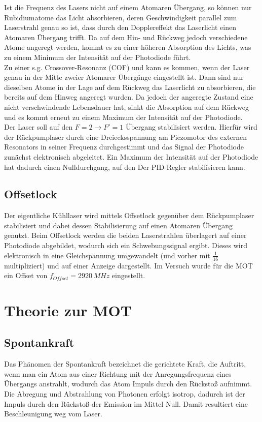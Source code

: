 \documentclass[twoside,colorback,accentcolor=tud4c,11pt]{tudreport}
\begin{document}
Ist die Frequenz des Lasers nicht auf einem Atomaren Übergang, so können nur Rubidiumatome das Licht absorbieren, deren Geschwindigkeit parallel zum Laserstrahl genau so ist, dass durch den Dopplereffekt das Laserlicht einen Atomaren Übergang trifft. Da auf dem Hin- und Rückweg jedoch verschiedene Atome angeregt werden, kommt es zu einer höheren Absorption des Lichts, was zu einem Minimum der Intensität auf der Photodiode führt.\\
Zu einer s.g. Crossover-Resonanz (COF) und kann es kommen, wenn der Laser genau in der Mitte zweier Atomarer Übergänge eingestellt ist. Dann sind nur dieselben Atome in der Lage auf dem Rückweg das Laserlicht zu absorbieren, die bereits auf dem Hinweg angeregt wurden. Da jedoch der angeregte Zustand eine nicht verschwindende Lebensdauer hat, sinkt die Absorption auf dem Rückweg und es kommt erneut zu einem Maximum der Intensität auf der Photodiode.\\
Der Laser soll auf den $F=2\rightarrow F'=1$ Übergang stabilisiert werden. Hierfür wird der Rückpumplaser durch eine Dreiecksspannung am Piezomotor des externen Resonators in seiner Frequenz durchgestimmt und das Signal der Photodiode zunächst elektronisch abgeleitet. Ein Maximum der Intensität auf der Photodiode hat dadurch einen Nulldurchgang, auf den Der PID-Regler stabilisieren kann. 
\subsection{Offsetlock}
Der eigentliche Kühllaser wird mittels Offsetlock gegenüber dem Rückpumplaser stabilisiert und dabei dessen Stabilisierung auf einen Atomaren Übergang genutzt. Beim Offsetlock werden die beiden Laserstrahlen überlagert auf einer Photodiode abgebildet, wodurch sich ein Schwebungssignal ergibt. Dieses wird elektronisch in eine Gleichspannung umgewandelt (und vorher mit $\frac{1}{16}$ multipliziert) und auf einer Anzeige dargestellt. Im Versuch wurde für die MOT ein Offset von $f_{Offset}=2920\,\si{MHz}$ eingestellt.
\section{Theorie zur MOT}\label{theorie} 
\subsection{Spontankraft}
Das Phänomen der Spontankraft bezeichnet die gerichtete Kraft, die Auftritt, wenn man ein Atom aus einer Richtung mit der Anregungsfrequenz eines Übergangs anstrahlt, wodurch das Atom Impuls durch den Rückstoß aufnimmt. Die Abregung und Abstrahlung von Photonen erfolgt isotrop, dadurch ist der Impuls durch den Rückstoß der Emission im Mittel Null. Damit resultiert eine Beschleunigung weg vom Laser.
\end{document}
